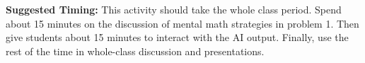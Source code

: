 \documentclass[nooutcomes,noauthor,handout]{ximera}
\begin{document}
\begin{instructorNotes}
\begin{itemize}
\end{itemize}






{\bf Suggested Timing:} This activity should take the whole class period. Spend about 15 minutes on the discussion of mental math strategies in problem 1. Then give students about 15 minutes to interact with the AI output.  Finally, use the rest of the time in whole-class discussion and presentations.

\end{instructorNotes}
\end{document}
